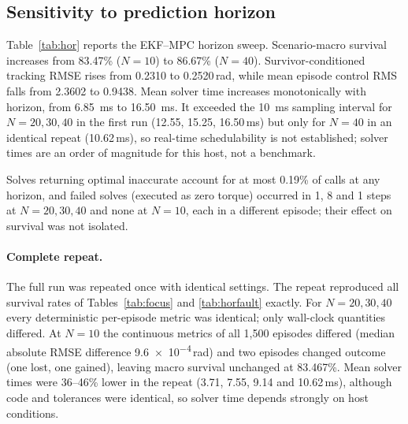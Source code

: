 \documentclass[preprint,12pt,authoryear=false]{elsarticle}
\theoremstyle{remark}\newtheorem{remark}{Remark}
\theoremstyle{plain}\newtheorem{proposition}{Proposition}\newtheorem{lemma}{Lemma}
\theoremstyle{definition}\newtheorem{assumption}{Assumption}
\begin{document}
\subsection{Sensitivity to prediction horizon}\label{sec:horizon}
Table~\ref{tab:hor} reports the EKF--MPC horizon sweep. Scenario-macro survival increases from 83.47\% ($N=10$) to 86.67\% ($N=40$). Survivor-conditioned tracking RMSE rises from 0.2310 to 0.2520\,rad, while mean episode control RMS falls from 2.3602 to 0.9438. Mean solver time increases monotonically with horizon, from \SI{6.85}{ms} to \SI{16.50}{ms}. It exceeded the \SI{10}{ms} sampling interval for $N=20,30,40$ in the first run (12.55, 15.25, 16.50\,ms) but only for $N=40$ in an identical repeat (10.62\,ms), so real-time schedulability is not established; solver times are an order of magnitude for this host, not a benchmark.

\begin{table}[t]\centering\small
\caption{EKF--MPC scenario-macro horizon sweep (1{,}500 unique episodes per horizon, first complete frozen run). RMSE is conditioned on survival. Solver calls: 630{,}685; 646{,}252; 651{,}961; 653{,}421 for $N=10,20,30,40$.}\label{tab:hor}
\end{table}

Solves returning optimal inaccurate account for at most 0.19\% of calls at any horizon, and failed solves (executed as zero torque) occurred in 1, 8 and 1 steps at $N=20,30,40$ and none at $N=10$, each in a different episode; their effect on survival was not isolated.

\paragraph{Complete repeat.} The full run was repeated once with identical settings. The repeat reproduced all survival rates of Tables~\ref{tab:focus} and \ref{tab:horfault} exactly. For $N=20,30,40$ every deterministic per-episode metric was identical; only wall-clock quantities differed. At $N=10$ the continuous metrics of all 1{,}500 episodes differed (median absolute RMSE difference \num{9.6e-4}\,rad) and two episodes changed outcome (one lost, one gained), leaving macro survival unchanged at 83.467\%. Mean solver times were 36--46\% lower in the repeat (3.71, 7.55, 9.14 and 10.62\,ms), although code and tolerances were identical, so solver time depends strongly on host conditions.
\end{document}
